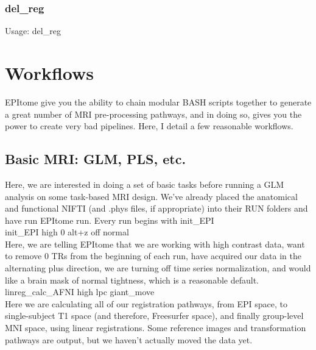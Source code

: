 \documentclass[final,titlepage,letterpaper,oneside,12pt]{article}
\renewcommand{\texttt}[2][BrickRed]{\textcolor{#1}{\ttfamily #2}}%
\begin{document}
\subsubsection{del\_reg}
Usage: \texttt{del\_reg}

\section{Workflows}

EPItome give you the ability to chain modular BASH scripts together to generate a great number of MRI pre-processing pathways, and in doing so, gives you the power to create very bad pipelines. Here, I detail a few reasonable workflows.

\subsection{Basic MRI: GLM, PLS, etc.}

Here, we are interested in doing a set of basic tasks before running a GLM analysis on some task-based MRI design. We've already placed the anatomical and functional NIFTI (and .phys files, if appropriate) into their RUN folders and have run \texttt{EPItome run}. Every run begins with \texttt{init\_EPI} \\

\noindent
\texttt{init\_EPI high 0 alt+z off normal} \\

Here, we are telling EPItome that we are working with high contrast data, want to remove 0 TRs from the beginning of each run, have acquired our data in the alternating plus direction, we are turning off time series normalization, and would like a brain mask of normal tightness, which is a reasonable default. \\

\noindent
\texttt{linreg\_calc\_AFNI high lpc giant\_move} \\

Here we are calculating all of our registration pathways, from EPI space, to single-subject T1 space (and therefore, Freesurfer space), and finally group-level MNI space, using linear registrations. Some reference images and transformation pathways are output, but we haven't actually moved the data yet. \\
\end{document}
